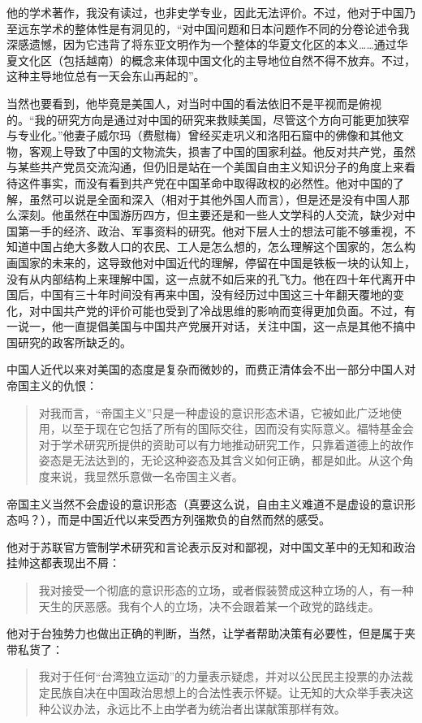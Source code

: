 他的学术著作，我没有读过，也非史学专业，因此无法评价。不过，他对于中国乃至远东学术的整体性是有洞见的，“对中国问题和日本问题作不同的分卷论述令我深感遗憾，因为它违背了将东亚文明作为一个整体的华夏文化区的本义……通过华夏文化区（包括越南）的概念来体现中国文化的主导地位自然不得不放弃。不过，这种主导地位总有一天会东山再起的”。

当然也要看到，他毕竟是美国人，对当时中国的看法依旧不是平视而是俯视的。“我的研究方向是通过对中国的研究来救赎美国，尽管这个方向可能更加狭窄与专业化。”他妻子威尔玛（费慰梅）曾经买走巩义和洛阳石窟中的佛像和其他文物，客观上导致了中国的文物流失，损害了中国的国家利益。他反对共产党，虽然与某些共产党员交流沟通，但仍旧是站在一个美国自由主义知识分子的角度上来看待这件事实，而没有看到共产党在中国革命中取得政权的必然性。他对中国的了解，虽然可以说是全面和深入（相对于其他外国人而言），但是还是没有中国人那么深刻。他虽然在中国游历四方，但主要还是和一些人文学科的人交流，缺少对中国第一手的经济、政治、军事资料的研究。他对下层人士的想法可能不够重视，不知道中国占绝大多数人口的农民、工人是怎么想的，怎么理解这个国家的，怎么构画国家的未来的，这导致他对中国近代的理解，停留在中国是铁板一块的认知上，没有从内部结构上来理解中国，这一点就不如后来的孔飞力。他在四十年代离开中国后，中国有三十年时间没有再来中国，没有经历过中国这三十年翻天覆地的变化，对中国共产党的评价可能也受到了冷战思维的影响而变得更加负面。不过，有一说一，他一直提倡美国与中国共产党展开对话，关注中国，这一点是其他不搞中国研究的政客所缺乏的。

中国人近代以来对美国的态度是复杂而微妙的，而费正清体会不出一部分中国人对帝国主义的仇恨：
\begin{quotation}
对我而言，“帝国主义”只是一种虚设的意识形态术语，它被如此广泛地使用，以至于现在它包括了所有的国际交往，因而没有实际意义。福特基金会对于学术研究所提供的资助可以有力地推动研究工作，只靠着道德上的故作姿态是无法达到的，无论这种姿态及其含义如何正确，都是如此。从这个角度来说，我显然乐意做一名帝国主义者。
\end{quotation}

帝国主义当然不会虚设的意识形态（真要这么说，自由主义难道不是虚设的意识形态吗？），而是中国近代以来受西方列强欺负的自然而然的感受。

他对于苏联官方管制学术研究和言论表示反对和鄙视，对中国文革中的无知和政治挂帅这都表现出不屑：
\begin{quotation}
我对接受一个彻底的意识形态的立场，或者假装赞成这种立场的人，有一种天生的厌恶感。我有个人的立场，决不会跟着某一个政党的路线走。
\end{quotation}

他对于台独势力也做出正确的判断，当然，让学者帮助决策有必要性，但是属于夹带私货了：
\begin{quotation}
    我对于任何“台湾独立运动”的力量表示疑虑，并对以公民民主投票的办法裁定民族自决在中国政治思想上的合法性表示怀疑。让无知的大众举手表决这种公议办法，永远比不上由学者为统治者出谋献策那样有效。
\end{quotation}

